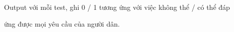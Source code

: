 Output
với mỗi test, ghi 0 / 1 tương ứng với việc không thể / có thể đáp

ứng được mọi yêu cầu của người dân.